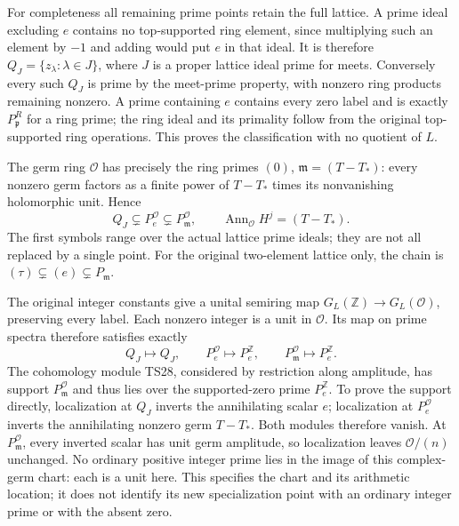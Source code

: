 For completeness all remaining prime points retain the full lattice.
A prime ideal excluding \(e\) contains no top-supported ring element,
since multiplying such an element by \(-1\) and adding would put
\(e\) in that ideal. It is therefore
\(Q_J=\{z_\lambda:\lambda\in J\}\), where \(J\) is a
proper lattice ideal prime for meets. Conversely every such \(Q_J\)
is prime by the meet-prime property, with nonzero ring products
remaining nonzero. A prime containing \(e\) contains every zero
label and is exactly \(P_{\mathfrak p}^R\) for a ring prime;
the ring ideal and its primality follow from the original top-supported
ring operations. This proves the classification with no quotient of \(L\).

The germ ring \(\mathcal O\) has precisely the ring primes
\((0)\), \(\mathfrak m=(T-T_*)\): every nonzero germ factors
as a finite power of \(T-T_*\) times its nonvanishing holomorphic
unit. Hence
\[
 Q_J\subsetneq P_e^{\mathcal O}\subsetneq
 P_{\mathfrak m}^{\mathcal O},\qquad
 \operatorname{Ann}_{\mathcal O}H^j=(T-T_*).
 \tag{TS31}
\]
The first symbols range over the actual lattice prime ideals; they
are not all replaced by a single point. For the original two-element
lattice only, the chain is \((\tau)\subsetneq(e)\subsetneq
P_{\mathfrak m}\).

The original integer constants give a unital semiring map
\(G_L(\mathbb Z)\to G_L(\mathcal O)\), preserving every label.
Each nonzero integer is a unit in \(\mathcal O\). Its map on prime
spectra therefore satisfies exactly
\[
 Q_J\longmapsto Q_J,\qquad
 P_e^{\mathcal O}\longmapsto P_e^{\mathbb Z},\qquad
 P_{\mathfrak m}^{\mathcal O}\longmapsto P_e^{\mathbb Z}.
 \tag{TS32}
\]
The cohomology module TS28, considered by restriction along amplitude,
has support \(P_{\mathfrak m}^{\mathcal O}\) and thus lies over
the supported-zero prime \(P_e^{\mathbb Z}\). To prove the support
directly, localization at \(Q_J\) inverts the annihilating scalar
\(e\); localization at \(P_e^{\mathcal O}\) inverts the annihilating
nonzero germ \(T-T_*\). Both modules therefore vanish. At
\(P_{\mathfrak m}^{\mathcal O}\), every inverted scalar has unit
germ amplitude, so localization leaves \(\mathcal O/(n)\) unchanged.
No ordinary positive
integer prime lies in the image of this complex-germ chart: each is
a unit here. This specifies the chart and its arithmetic location;
it does not identify its new specialization point with an ordinary
integer prime or with the absent zero.

